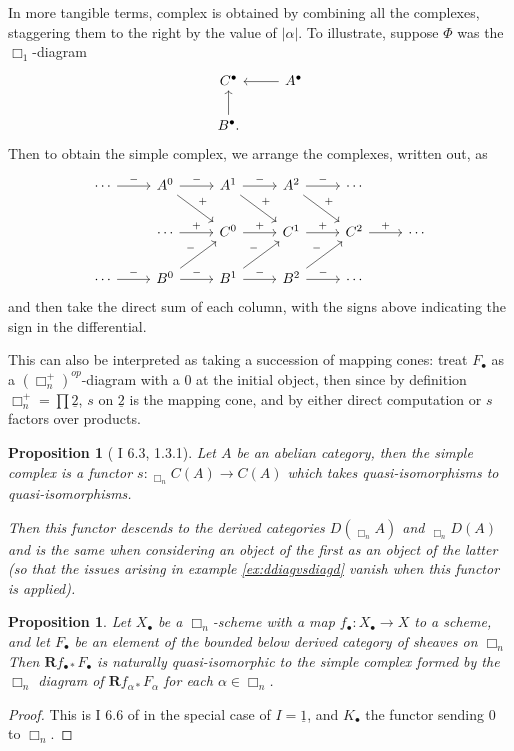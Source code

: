 \documentclass[proquest]{uwthesis}[2014/11/13]
\newtheorem{prop}[theorem]{Proposition}
\theoremstyle{definition}
\DeclareMathOperator{\Diag}{\underline{Diag}}
\newcommand{\bR}{\textbf{R}}
\newcommand{\tu}{\underline{2}}
\begin{document}
In more tangible terms, complex is obtained by combining all the complexes, staggering them to the right by the value of $|\alpha|$.
To illustrate, suppose $\Phi$ was the $\Box_1$-diagram
\[
\begin{tikzcd}
C^\bullet & \arrow{l} A^\bullet \\
B^\bullet \arrow{u}.
\end{tikzcd}
\]
Then to obtain the simple complex, we arrange the complexes, written out, as
\[
\begin{tikzcd}
\cdots \arrow{r}{-} &  A^0 \arrow{r}{-} \arrow{dr}{+} & A^1 \arrow{r}{-} \arrow{dr}{+} & A^2 \arrow{r}{-} \arrow{dr}{+} & \cdots \\
& \cdots \arrow{r}{+} & C^0 \arrow{r}{+} & C^1 \arrow{r}{+} & C^2 \arrow{r}{+} & \cdots \\
\cdots \arrow{r}{-} & B^0 \arrow{r}{-} \arrow{ur}{-} & B^1 \arrow{r}{-} \arrow{ur}{-} & B^2 \arrow{r}{-} \arrow{ur}{-} & \cdots
\end{tikzcd}
\]
and then take the direct sum of each column, with the signs above indicating the sign in the differential.

This can also be interpreted as taking a succession of mapping cones: treat $F_\bullet$ as a $(\Box_n^+)^{op}$-diagram with a 0 at the initial object, then since by definition $\Box_n^+ = \prod \tu$, $s$ on $\tu$ is the mapping cone, and by either direct computation or \cite{Guillen2002} $s$ factors over products.

\begin{prop}[\cite{Guillen1988} I 6.3, \cite{Guillen2002} 1.3.1]
	Let $A$ be an abelian category, then the simple complex is a functor $s:\Diag_{\Box_n} C(A) \rightarrow C(A)$ which takes quasi-isomorphisms to quasi-isomorphisms.
	
	Then this functor descends to the derived categories $D(\Diag_{\Box_n} A)$ and $\Diag_{\Box_n} D(A)$ and is the same when considering an object of the first as an object of the latter (so that the issues arising in example \ref{ex:ddiagvsdiagd} vanish when this functor is applied).
\end{prop}
\begin{prop}
	\label{thm:simple}
	Let $X_\bullet$ be a $\Box_n$-scheme with a map $f_\bullet : X_\bullet \rightarrow X$ to a scheme, and let $F_\bullet$ be an element of the bounded below derived category of sheaves on $\Box_n$
	Then $\bR f_{\bullet *} F_\bullet$ is naturally quasi-isomorphic to the simple complex formed by the $\Box_n$ diagram of $\bR f_{\alpha *} F_\alpha$ for each $\alpha \in \Box_n$.
\end{prop}
\begin{proof}
	This is I 6.6 of \cite{Guillen1988} in the special case of $I = \underline{1}$, and $K_\bullet$ the functor sending 0 to $\Box_n$.
\end{proof}
\end{document}
